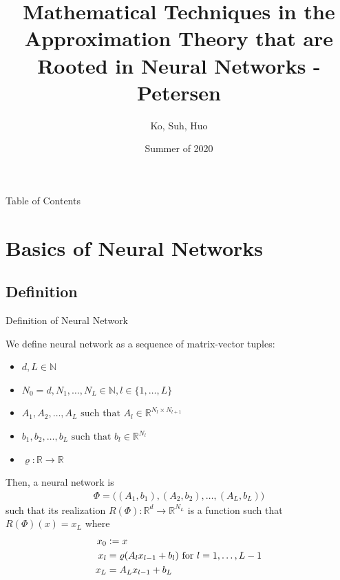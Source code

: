 \documentclass{if-beamer}
\title[Neural Networks in Approximation]{Mathematical Techniques in the Approximation Theory that are Rooted in Neural Networks - Petersen}
\author{Ko, Suh, Huo}
\institute{Georgia Tech}
\date{Summer of 2020}
\newcommand{\defeq}{\vcentcolon=}
\begin{document}
\begin{frame}
  \titlepage
\end{frame}


\begin{frame}{Table of Contents}
\tableofcontents
    
\end{frame}

\section{Basics of Neural Networks}

\subsection{Definition}
\begin{frame}{Definition of Neural Network}

\vskip 0.5cm
We define neural network as a sequence of matrix-vector tuples:
\begin{itemize}
  \item $d, L \in \mathbb{N}$
  \item $N_0 = d, N_1, \dots, N_L \in \mathbb{N}, l \in \{1,\dots,L\}$
  \item $A_1, A_2, \dots, A_L \text{ such that } A_l \in \mathbb{R}^{N_l \times N_{l+1}}$
  \item $b_1, b_2, \dots, b_L \text{ such that } b_l \in \mathbb{R}^{N_l}$
  \item $\varrho: \mathbb{R} \to \mathbb{R}$
\end{itemize}
Then, a neural network is 
\begin{align*}
    \Phi = \big((A_1,b_1),(A_2, b_2),\dots,(A_L, b_L) \big)
\end{align*}
such that its realization $R(\Phi): \mathbb{R}^d \to \mathbb{R}^{N_L}$ is a function such that $R(\Phi)(x) = x_L$ where
\begin{align*}
    x_0 &\defeq x\\
    x_l &= \varrho(A_l x_{l-1} + b_l) \text{ for } l=1,\dots,L-1\\
    x_L &= A_{L} x_{l-1} + b_L
\end{align*}

\end{frame}
\end{document}

